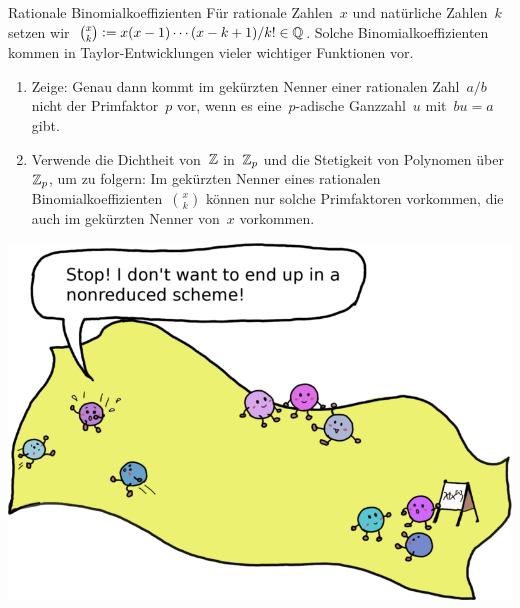 \documentclass{uebblatt}
\begin{document}

\vfill

\begin{aufgabe}{0}{Rationale Binomialkoeffizienten}
\small
Für rationale Zahlen~$x$ und natürliche Zahlen~$k$ setzen wir~$\binom{x}{k}
\vcentcolon= x (x-1) \cdots (x-k+1) / k! \in \mathbb{Q}$. Solche Binomialkoeffizienten
kommen in Taylor-Entwicklungen vieler wichtiger Funktionen vor.
\begin{enumerate}
\item Zeige: Genau dann kommt im gekürzten Nenner einer rationalen Zahl~$a/b$
nicht der Primfaktor~$p$ vor, wenn es eine~$p$-adische Ganzzahl~$u$ mit~$bu = a$ gibt.
\item Verwende die Dichtheit von~$\mathbb{Z}$ in~$\mathbb{Z}_p$ und die Stetigkeit von
Polynomen über~$\mathbb{Z}_p$, um zu folgern: Im gekürzten Nenner eines rationalen
Binomialkoeffizienten~$\binom{x}{k}$ können nur solche Primfaktoren vorkommen, die auch
im gekürzten Nenner von~$x$ vorkommen.
\end{enumerate}
\end{aufgabe}

\centering
\includegraphics{images/hilbert-scheme-of-points}
\end{document}
